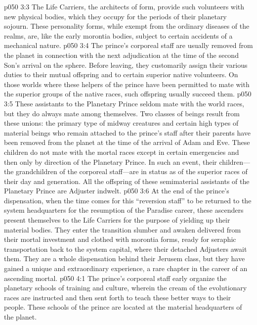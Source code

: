 \vs p050 3:3 The Life Carriers, the architects of form, provide such volunteers with new physical bodies, which they occupy for the periods of their planetary sojourn. These personality forms, while exempt from the ordinary diseases of the realms, are, like the early morontia bodies, subject to certain accidents of a mechanical nature.
\pc \vs p050 3:4 The prince’s corporeal staff are usually removed from the planet in connection with the next adjudication at the time of the second Son’s arrival on the sphere. Before leaving, they customarily assign their various duties to their mutual offspring and to certain superior native volunteers. On those worlds where these helpers of the prince have been permitted to mate with the superior groups of the native races, such offspring usually succeed them.
\vs p050 3:5 These assistants to the Planetary Prince seldom mate with the world races, but they do always mate among themselves. Two classes of beings result from these unions: the primary type of midway creatures and certain high types of material beings who remain attached to the prince’s staff after their parents have been removed from the planet at the time of the arrival of Adam and Eve. These children do not mate with the mortal races except in certain emergencies and then only by direction of the Planetary Prince. In such an event, their children---the grandchildren of the corporeal staff---are in status as of the superior races of their day and generation. All the offspring of these semimaterial assistants of the Planetary Prince are Adjuster indwelt.
\vs p050 3:6 At the end of the prince’s dispensation, when the time comes for this “reversion staff” to be returned to the system headquarters for the resumption of the Paradise career, these ascenders present themselves to the Life Carriers for the purpose of yielding up their material bodies. They enter the transition slumber and awaken delivered from their mortal investment and clothed with morontia forms, ready for seraphic transportation back to the system capital, where their detached Adjusters await them. They are a whole dispensation behind their Jerusem class, but they have gained a unique and extraordinary experience, a rare chapter in the career of an ascending mortal.
\vs p050 4:1 The prince’s corporeal staff early organize the planetary schools of training and culture, wherein the cream of the evolutionary races are instructed and then sent forth to teach these better ways to their people. These schools of the prince are located at the material headquarters of the planet.
